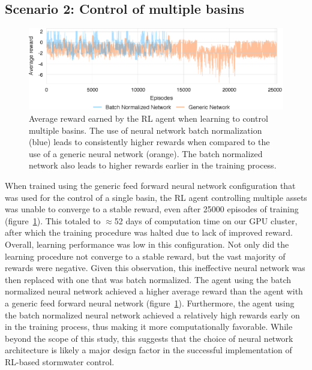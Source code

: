 \subsection{Scenario 2: Control of multiple basins}

\begin{figure}
    \centering
    \includegraphics[width=\textwidth]{gfx/Chapter-3/system_tarining.eps}
    \caption{Average reward earned by the RL agent when learning to control multiple basins. The use of neural network batch normalization (blue) leads to consistently higher rewards when compared to the use of a generic neural network (orange).  The batch normalized network also leads to higher rewards earlier in the training process.}
    \label{fig:4}
\end{figure}


When trained using the generic feed forward neural network configuration that was used for the control of a single basin, the RL agent controlling multiple assets was unable to converge to a stable reward, even after 25000 episodes of training (figure~\ref{fig:4}).
This totaled to $\approx$52 days of computation time on our GPU cluster, after which the training procedure was halted due to lack of improved reward.
Overall, learning performance was low in this configuration.
Not only did the learning procedure not converge to a stable reward, but the vast majority of rewards were negative.
Given this observation, this ineffective neural network was then replaced with one that was batch normalized.
The agent using the batch normalized neural network achieved a higher average reward than the agent with a generic feed forward neural network (figure~\ref{fig:4}).
Furthermore, the agent using the batch normalized neural network achieved a relatively high rewards early on in the training process, thus making it more computationally favorable.
While beyond the scope of this study, this suggests that the choice of neural network architecture is likely a major design factor in the successful implementation of RL-based stormwater control.

\

